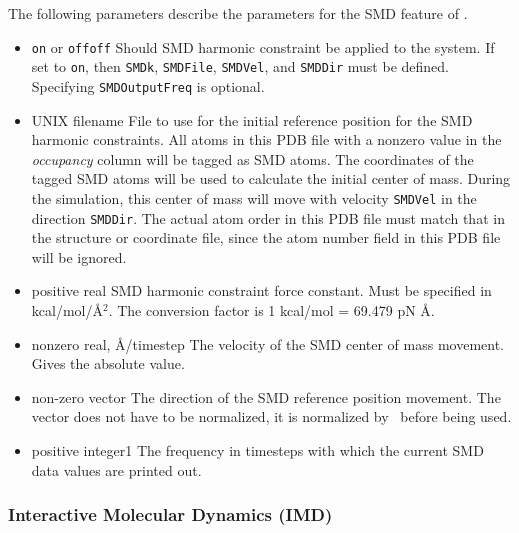 The following parameters describe the parameters for the 
SMD feature of \NAMD.
\begin{itemize}
\item 
{}
{{\tt on} or {\tt off}}{{\tt off}}
{Should SMD harmonic constraint be applied to the system. If set 
to {\tt on}, then  {\tt SMDk}, {\tt SMDFile}, {\tt SMDVel}, and
{\tt SMDDir} must be defined.  Specifying {\tt SMDOutputFreq} 
is optional.}

\item
{}
{UNIX filename} {File to use for the initial reference position for the SMD
harmonic constraints.  All atoms in this PDB file with a nonzero value in the
{\em occupancy} column will be tagged as SMD atoms.  The coordinates of the
tagged SMD atoms will be used to calculate the initial center of mass.
During the simulation, this center of mass will move with velocity
{\tt SMDVel} in the direction {\tt SMDDir}. The actual atom order in this PDB
file must match that in the structure or coordinate file, since the atom
number field in this PDB file will be ignored.}

\item
{}
{positive real}
{SMD harmonic constraint force constant. Must be specified in
kcal/mol/\AA$^2$. The conversion factor is 1 kcal/mol = 69.479 pN \AA.} 

\item
{}
{nonzero real, \AA/timestep}
{The velocity of the SMD center of mass movement. Gives the absolute
value.}

\item
{}
{non-zero vector}
{The direction of the SMD reference position movement. The vector does
not have to be normalized, it is normalized by \NAMD\ before being used.}

\item
{}
{positive integer}{1} {The frequency in timesteps with which the
current SMD data values are printed out.}
\end{itemize}


\subsubsection{Interactive Molecular Dynamics (IMD)}

